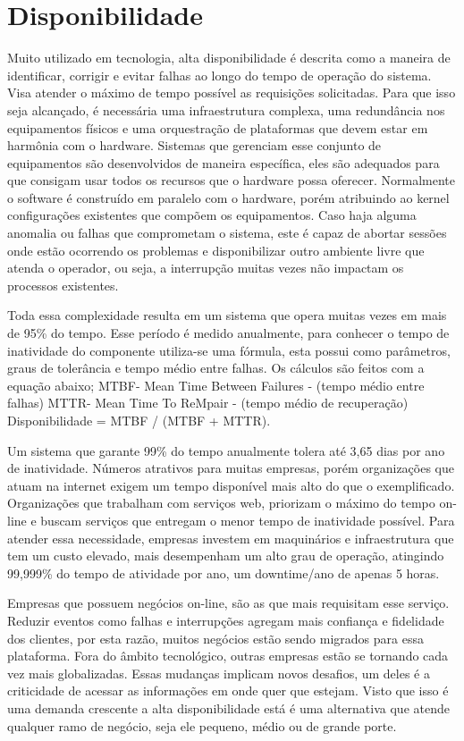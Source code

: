 \chapter{Disponibilidade}

Muito utilizado em tecnologia, alta disponibilidade é descrita como a maneira de identificar, corrigir e evitar falhas ao longo
do tempo de operação do sistema. Visa atender o máximo de tempo possível as requisições solicitadas. Para que isso seja
alcançado, é necessária uma infraestrutura complexa, uma redundância nos equipamentos físicos e uma orquestração de plataformas
que devem estar em harmônia com o hardware. Sistemas que gerenciam esse conjunto de equipamentos são desenvolvidos de maneira
específica, eles são adequados para que consigam usar todos os recursos que o hardware possa oferecer. Normalmente o software é
construído em paralelo com o hardware, porém atribuindo ao kernel configurações existentes que compõem os equipamentos.
Caso haja alguma anomalia ou falhas que comprometam o sistema, este é capaz de abortar sessões onde estão ocorrendo os problemas
e disponibilizar outro ambiente livre que atenda o operador, ou seja, a interrupção muitas vezes não impactam os processos
existentes.


Toda essa complexidade resulta em um sistema que opera muitas vezes em mais de 95\% do tempo. Esse período é medido anualmente,
para conhecer o tempo de inatividade do componente utiliza-se uma fórmula, esta possui como parâmetros, graus de tolerância e
tempo médio entre falhas. Os cálculos são feitos com a equação abaixo;
MTBF- Mean Time Between Failures - (tempo médio entre falhas)
MTTR- Mean Time To ReMpair - (tempo médio de recuperação)
Disponibilidade = MTBF / (MTBF + MTTR).


Um sistema que garante 99\% do tempo anualmente tolera até 3,65 dias por ano de inatividade. Números atrativos para muitas
empresas, porém organizações que atuam na internet exigem um tempo disponível mais alto do que o exemplificado. Organizações
que trabalham com serviços web, priorizam o máximo do tempo on-line e buscam serviços que entregam o menor tempo de inatividade
possível. Para atender essa necessidade, empresas investem em maquinários e infraestrutura que tem um custo elevado, mais
desempenham um alto grau de operação, atingindo 99,999\% do tempo de atividade por ano, um downtime/ano de apenas 5 horas.


Empresas que possuem negócios on-line, são as que mais requisitam esse serviço. Reduzir eventos como falhas e interrupções
agregam mais confiança e fidelidade dos clientes, por esta razão, muitos negócios estão sendo migrados para essa plataforma.
Fora do âmbito tecnológico, outras empresas estão se tornando cada vez mais globalizadas. Essas mudanças implicam novos
desafios, um deles é a criticidade de acessar as informações em onde quer que estejam. Visto que isso é uma demanda crescente
a alta disponibilidade está é uma alternativa que atende qualquer ramo de negócio, seja ele pequeno, médio ou de grande porte.


